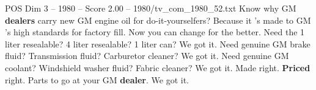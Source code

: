 \begin{textsample}{POS Dim 3 – 1980 – Score 2.00 – 1980/tv\_com\_1980\_52.txt}  \label{ex:f3_pos_055}
Know why GM \textbf{dealers} carry new GM engine oil for do-it-yourselfers?
Because it 's made to GM 's high standards for factory fill.
Now you can change for the better.
Need the 1 liter resealable? 4 liter resealable? 1 liter can?
We got it.
Need genuine GM brake fluid?
Transmission fluid?
Carburetor cleaner?
We got it.
Need genuine GM coolant?
Windshield washer fluid?
Fabric cleaner?
We got it.
Made right. \textbf{Priced} right.
Parts to go at your GM \textbf{dealer}.
We got it.

\end{textsample}
